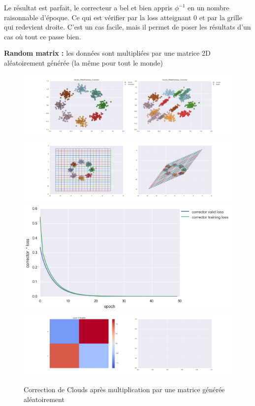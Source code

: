 Le résultat est parfait, le correcteur a bel et bien appris $\phi^{-1}$ en un nombre raisonnable d'époque.
Ce qui est vérifier par la loss atteignant 0 et par la grille qui redevient droite.
C'est un cas facile, mais il permet de poser les résultats d'un cas où tout ce passe bien.


{\Large \textbf{Random matrix :}} les données sont multipliées par une matrice 2D aléatoirement générée
 (la même pour tout le monde)

\begin{figure}[H] %
\centering
\includegraphics[width=\linewidth]{fig/24-05-2016/clouds/Clouds_RMatPairwise_Corrector-DATA.png}
\includegraphics[width=\linewidth]{fig/24-05-2016/clouds/Clouds_RMatPairwise_Corrector-GridCheck.png}
\includegraphics[width=0.45\linewidth]{fig/24-05-2016/clouds/Clouds_RMatPairwise_Corrector-Learning_curve.png}
\includegraphics[width=\linewidth]{fig/24-05-2016/clouds/Clouds_RMatPairwise_Corrector-W.png}
\caption{Correction de Clouds après multiplication par une matrice générée aléatoirement}
\label{fig:recap-clouds-RMat-pairwise}
\end{figure}

